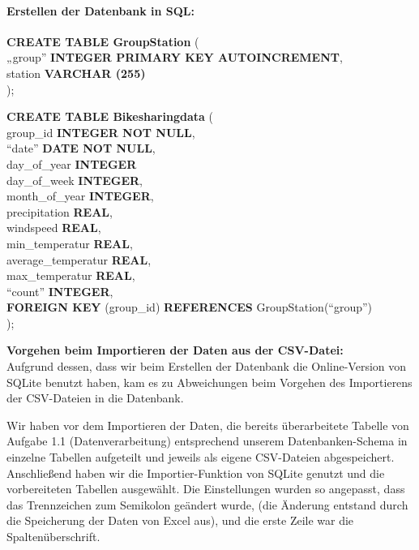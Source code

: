 \documentclass[11pt]{article}
\begin{document}
\paragraph{Erstellen der Datenbank in SQL:\\}
\vspace{1em}

\textbf{CREATE TABLE GroupStation} ( \\
        „group” \textbf{INTEGER PRIMARY KEY AUTOINCREMENT},\\
        station \textbf{VARCHAR (255)}\\
    );
\vspace{1em}

    \textbf{CREATE TABLE Bikesharingdata} (\\
        group\_id \textbf{INTEGER NOT NULL}, \\
        “date” \textbf{DATE NOT NULL},\\
        day\_of\_year \textbf{INTEGER}\\
        day\_of\_week \textbf{INTEGER},\\
        month\_of\_year \textbf{INTEGER},\\
        precipitation \textbf{REAL},\\
        windspeed \textbf{REAL},\\
        min\_temperatur \textbf{REAL},\\
        average\_temperatur \textbf{REAL},\\
        max\_temperatur \textbf{REAL},\\
        “count” \textbf{INTEGER},\\
        \textbf{FOREIGN KEY} (group\_id) \textbf{REFERENCES} GroupStation(“group”)\\
    );\\
\vspace{1em}
    
\textbf{Vorgehen beim Importieren der Daten aus der CSV-Datei:}\\
Aufgrund dessen, dass wir beim Erstellen der Datenbank die Online-Version von SQLite benutzt haben, kam es zu Abweichungen beim Vorgehen des Importierens der CSV-Dateien in die Datenbank. 

Wir haben vor dem Importieren der Daten, die bereits überarbeitete Tabelle von
Aufgabe 1.1 (Datenverarbeitung) entsprechend unserem Datenbanken-Schema in einzelne Tabellen aufgeteilt und jeweils als eigene CSV-Dateien abgespeichert. Anschließend haben wir die Importier-Funktion von SQLite genutzt und die vorbereiteten Tabellen ausgewählt. Die Einstellungen wurden so angepasst, dass das Trennzeichen zum Semikolon geändert wurde, (die Änderung entstand durch die Speicherung der Daten von Excel aus), und die erste Zeile war die Spaltenüberschrift. 
\end{document}
